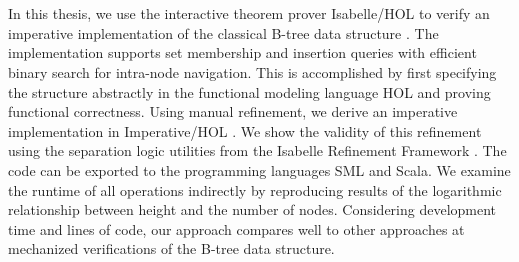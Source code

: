 \chapter{\abstractname}

In this thesis, we use the interactive theorem prover Isabelle/HOL \parencite{DBLP:books/sp/NipkowPW02}
to verify an imperative implementation of the classical B-tree data structure \parencite{DBLP:journals/acta/BayerM72}.
The implementation supports set membership and insertion queries
with efficient binary search for intra-node navigation.
This is accomplished by first specifying the structure abstractly 
in the functional modeling language HOL and proving functional correctness.
Using manual refinement, we derive an imperative implementation
in Imperative/HOL \parencite{DBLP:conf/tphol/BulwahnKHEM08}.
We show the validity of this refinement using
the separation logic utilities from the
Isabelle Refinement Framework \parencite{DBLP:journals/jar/Lammich19}. 
The code can be exported to the programming languages SML and Scala.
We examine the runtime of all operations indirectly by reproducing results
of the logarithmic relationship between height and the number of nodes.
Considering development time and lines of code,
our approach compares well to other approaches at mechanized
verifications of the B-tree data structure.




